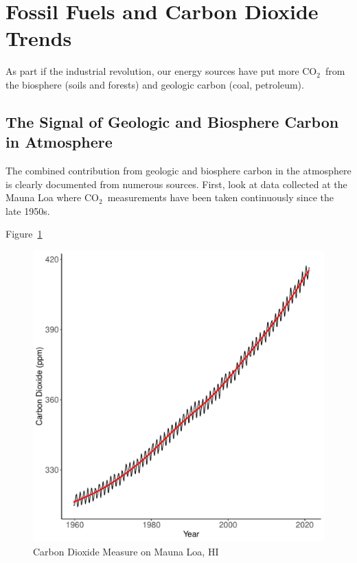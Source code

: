 \documentclass{book}\usepackage{knitr}
\newcommand{\carbondioxide}{CO$_2$~}
\begin{document}
\section{Fossil Fuels and Carbon Dioxide Trends}\label{sec:fossilfuels}

As part if the industrial revolution, our energy sources have put more \carbondioxide from the biosphere (soils and forests) and geologic carbon (coal, petroleum). 

\subsection{The Signal of Geologic and Biosphere Carbon in Atmosphere}

The combined contribution from geologic and biosphere carbon in the atmosphere is clearly documented from numerous sources. First, look at data collected at the Mauna Loa where \carbondioxide measurements have been taken continuously since the late 1950s. 

Figure~\ref{fig:maunaloa2}

\begin{figure}
\begin{knitrout}
\color{fgcolor}
\includegraphics[width=\maxwidth]{figure/maunaloa3-1} 

\end{knitrout}
\caption{Carbon Dioxide Measure on Mauna Loa, HI}
\label{fig:maunaloa2}
\end{figure}
\end{document}
